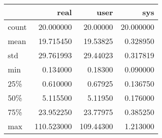 \begin{tabular}{lrrr}
\toprule
{} &        real &       user &        sys \\
\midrule
count &   20.000000 &   20.00000 &  20.000000 \\
mean  &   19.715450 &   19.53825 &   0.328950 \\
std   &   29.761993 &   29.44023 &   0.317819 \\
min   &    0.134000 &    0.18300 &   0.090000 \\
25\%   &    0.610000 &    0.67925 &   0.136750 \\
50\%   &    5.115500 &    5.11950 &   0.176000 \\
75\%   &   23.952250 &   23.77975 &   0.385250 \\
max   &  110.523000 &  109.44300 &   1.213000 \\
\bottomrule
\end{tabular}
